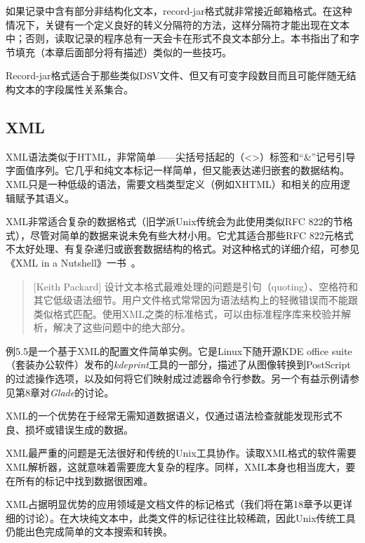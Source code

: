 \documentclass[12pt,oneside]{ctexbook}
\begin{document}
\begin{common-format}
如果记录中含有部分非结构化文本，record-jar格式就非常接近邮箱格式。在这种情况下，关键有一个定义良好的转义分隔符的方法，这样分隔符才能出现在文本中；否则，读取记录的程序总有一天会卡在形式不良文本部分上。本书指出了和字节填充（本章后面部分将有描述）类似的一些技巧。

Record-jar格式适合于那些类似DSV文件、但又有可变字段数目而且可能伴随无结构文本的字段属性关系集合。

\subsection{ XML}
XML语法类似于HTML，非常简单——尖括号括起的（<>）标签和“\&{}”记号引导字面值序列。它几乎和纯文本标记一样简单，但又能表达递归嵌套的数据结构。XML只是一种低级的语法，需要文档类型定义（例如XHTML）和相关的应用逻辑赋予其语义。

XML非常适合复杂的数据格式（旧学派Unix传统会为此使用类似RFC 822的节格式），尽管对简单的数据来说未免有些大材小用。它尤其适合那些RFC 822元格式不太好处理、有复杂递归或嵌套数据结构的格式。对这种格式的详细介绍，可参见《XML in a Nutshell》一书~\cite{Harold-Means}。
\begin{quote}[Keith Packard]
设计文本格式最难处理的问题是引句（quoting）、空格符和其它低级语法细节。用户文件格式常常因为语法结构上的轻微错误而不能跟类似格式匹配。使用XML之类的标准格式，可以由标准程序库来校验并解析，解决了这些问题中的绝大部分。
\end{quote}

例5.5是一个基于XML的配置文件简单实例。它是Linux下随开源KDE office suite（套装办公软件）发布的\textit{kdeprint}工具的一部分，描述了从图像转换到PostScript的过滤操作选项，以及如何将它们映射成过滤器命令行参数。另一个有益示例请参见第8章对\textit{Glade}的讨论。

XML的一个优势在于经常无需知道数据语义，仅通过语法检查就能发现形式不良、损坏或错误生成的数据。

XML最严重的问题是无法很好和传统的Unix工具协作。读取XML格式的软件需要XML解析器，这就意味着需要庞大复杂的程序。同样，XML本身也相当庞大，要在所有的标记中找到数据很困难。

XML占据明显优势的应用领域是文档文件的标记格式（我们将在第18章予以更详细的讨论）。在大块纯文本中，此类文件的标记往往比较稀疏，因此Unix传统工具仍能出色完成简单的文本搜索和转换。


\end{common-format}
\end{document}
